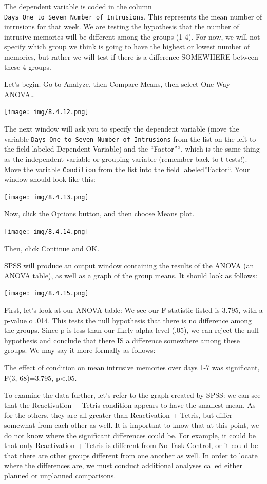 \documentclass[]{book}
\begin{document}
The dependent variable is coded in the column
\texttt{Days\_One\_to\_Seven\_Number\_of\_Intrusions}. This represents
the mean number of intrusions for that week. We are testing the
hypothesis that the number of intrusive memories will be different among
the groups (1-4). For now, we will not specify which group we think is
going to have the highest or lowest number of memories, but rather we
will test if there is a difference SOMEWHERE between these 4 groups.

Let's begin. Go to {Analyze}, then {Compare Means}, then select {One-Way
ANOVA\ldots{}}

\texttt{[image: img/8.4.12.png]}

The next window will ask you to specify the dependent variable (move the
variable \texttt{Days\_One\_to\_Seven\_Number\_of\_Intrusions} from the
list on the left to the field labeled Dependent Variable) and the
``Factor''``, which is the same thing as the independent variable or
grouping variable (remember back to t-tests!). Move the variable
\texttt{Condition} from the list into the field labeled''Factor``. Your
window should look like this:

\texttt{[image: img/8.4.13.png]}

Now, click the {Options} button, and then choose {Means plot}.

\texttt{[image: img/8.4.14.png]}

Then, click {Continue} and {OK}.

SPSS will produce an output window containing the results of the ANOVA
(an ANOVA table), as well as a graph of the group means. It should look
as follows:

\texttt{[image: img/8.4.15.png]}

First, let's look at our ANOVA table: We see our F-statistic listed is
3.795, with a p-value o .014. This tests the null hypothesis that there
is no difference among the groups. Since p is less than our likely alpha
level (.05), we can reject the null hypothesis and conclude that there
IS a difference somewhere among these groups. We may say it more
formally as follows:

The effect of condition on mean intrusive memories over days 1-7 was
significant, F(3, 68)=3.795, p\textless{}.05.

To examine the data further, let's refer to the graph created by SPSS:
we can see that the Reactivation + Tetris condition appears to have the
smallest mean. As for the others, they are all greater than Reactivation
+ Tetris, but differ somewhat from each other as well. It is important
to know that at this point, we do not know where the significant
differences could be. For example, it could be that only Reactivation +
Tetris is different from No-Task Control, or it could be that there are
other groups different from one another as well. In order to locate
where the differences are, we must conduct additional analyses called
either planned or unplanned comparisons.
\end{document}
